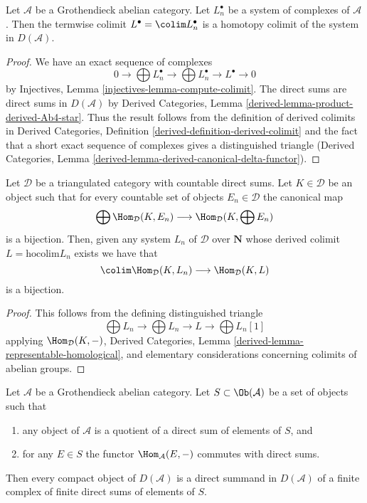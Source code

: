 \begin{lemma}
\label{lemma-colim-hocolim}
Let $\mathcal{A}$ be a Grothendieck abelian category. Let $L_n^\bullet$
be a system of complexes of $\mathcal{A}$. Then the termwise
colimit $L^\bullet = \colim L_n^\bullet$ is a homotopy colimit of the
system in $D(\mathcal{A})$.
\end{lemma}

\begin{proof}
We have an exact sequence of complexes
$$
0 \to \bigoplus L_n^\bullet \to \bigoplus L_n^\bullet \to L^\bullet \to 0
$$
by Injectives, Lemma \ref{injectives-lemma-compute-colimit}.
The direct sums are direct sums in $D(\mathcal{A})$ by
Derived Categories, Lemma \ref{derived-lemma-product-derived-Ab4-star}.
Thus the result follows from the definition
of derived colimits in
Derived Categories, Definition \ref{derived-definition-derived-colimit}
and the fact that a short exact sequence of complexes
gives a distinguished triangle
(Derived Categories, Lemma
\ref{derived-lemma-derived-canonical-delta-functor}).
\end{proof}

\begin{lemma}
\label{lemma-commutes-with-countable-sums}
Let $\mathcal{D}$ be a triangulated category with countable direct sums.
Let $K \in \mathcal{D}$ be an object such that for every
countable set of objects $E_n \in \mathcal{D}$ the canonical map
$$
\bigoplus \Hom_\mathcal{D}(K, E_n)
\longrightarrow
\Hom_\mathcal{D}(K, \bigoplus E_n)
$$
is a bijection. Then, given any system $L_n$ of $\mathcal{D}$ over
$\mathbf{N}$ whose derived colimit $L = \text{hocolim} L_n$
exists we have that
$$
\colim \Hom_\mathcal{D}(K, L_n) \longrightarrow \Hom_\mathcal{D}(K, L)
$$
is a bijection.
\end{lemma}

\begin{proof}
This follows from the defining distinguished triangle
$$
\bigoplus L_n \to \bigoplus L_n \to L \to \bigoplus L_n[1]
$$
applying $\Hom_\mathcal{D}(K, -)$,
Derived Categories, Lemma \ref{derived-lemma-representable-homological},
and elementary considerations concerning colimits of abelian groups.
\end{proof}

\begin{lemma}
\label{lemma-compact-in-terms-of-generators}
Let $\mathcal{A}$ be a Grothendieck abelian category. Let
$S \subset \Ob(\mathcal{A})$ be a set of objects such that
\begin{enumerate}
\item any object of $\mathcal{A}$ is a quotient of a direct sum
of elements of $S$, and
\item for any $E \in S$ the functor $\Hom_\mathcal{A}(E, -)$
commutes with direct sums.
\end{enumerate}
Then every compact object of $D(\mathcal{A})$ is a direct summand
in $D(\mathcal{A})$ of a finite complex of finite direct sums of
elements of $S$.
\end{lemma}

